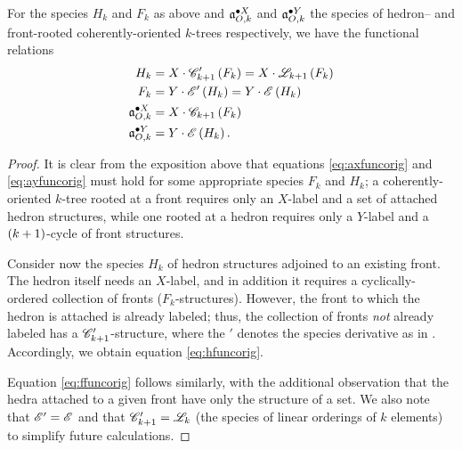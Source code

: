 \documentclass[sectionflow,singlespace,twoside,boldmathhdr]{brandiss} %
\numberwithin{section}{chapter}
\numberwithin{figure}{chapter}
\begin{document}
\begin{theorem}\label{thm:funcdecompco}
  For the species $H_{k}$ and $F_{k}$ as above and $\pointed[X]{\mathfrak{a}}_{O, k}$ and $\pointed[Y]{\mathfrak{a}}_{O, k}$ the species of hedron-- and front-rooted coherently-oriented $k$-trees respectively, we have the functional relations
  \begin{align}
    H_{k} &= X \cdot \specname{C}'_{k+1} \pbrac{F_{k}} = X \cdot \specname{L}_{k+1} \pbrac{F_{k}} \label{eq:hfuncorig} \\
    F_{k} &= Y \cdot \specname{E}' \pbrac{H_{k}} = Y \cdot \specname{E} \pbrac{H_{k}} \label{eq:ffuncorig} \\
    \pointed[X]{\mathfrak{a}}_{O, k} &= X \cdot \specname{C}_{k+1} \pbrac{F_{k}} \label{eq:axfuncorig} \\
    \pointed[Y]{\mathfrak{a}}_{O, k} &= Y \cdot \specname{E} \pbrac{H_{k}} \label{eq:ayfuncorig}.
  \end{align}
\end{theorem}

\begin{proof}
  It is clear from the exposition above that equations \eqref{eq:axfuncorig} and \eqref{eq:ayfuncorig} must hold for some appropriate species $F_{k}$ and $H_{k}$; a coherently-oriented $k$-tree rooted at a front requires only an $X$-label and a set of attached hedron structures, while one rooted at a hedron requires only a $Y$-label and a $\pbrac{k+1}$-cycle of front structures.

  Consider now the species $H_{k}$ of hedron structures adjoined to an existing front.
  The hedron itself needs an $X$-label, and in addition it requires a cyclically-ordered collection of fronts ($F_{k}$-structures).
  However, the front to which the hedron is attached is already labeled; thus, the collection of fronts \emph{not} already labeled has a $\specname{C}'_{k+1}$-structure, where the $'$ denotes the species derivative as in \cite[\S 1.4]{bll:species}.
  Accordingly, we obtain equation \eqref{eq:hfuncorig}.

  Equation \eqref{eq:ffuncorig} follows similarly, with the additional observation that the hedra attached to a given front have only the structure of a set.
  We also note that $\specname{E}' = \specname{E}$ and that $\specname{C}'_{k+1} = \specname{L}_{k}$ (the species of linear orderings of $k$ elements) to simplify future calculations.
\end{proof}
\end{document}
